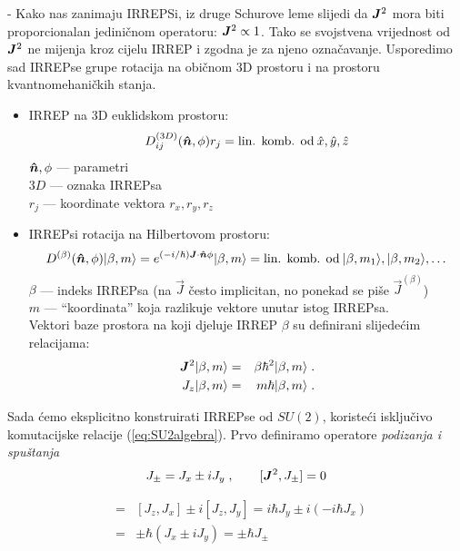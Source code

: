 - Kako nas zanimaju IRREPSi, iz druge Schurove leme slijedi da $\jsq$
mora biti proporcionalan jediničnom operatoru: $\jsq \propto \Eins$.
Tako se svojstvena vrijednost od $\jsq$ ne mijenja kroz cijelu IRREP i
zgodna je za njeno označavanje. Usporedimo sad IRREPse grupe rotacija
na običnom 3D prostoru i na prostoru kvantnomehaničkih stanja.

\begin{itemize}
\item  IRREP na 3D euklidskom prostoru:
\begin{displaymath}
   D^{(3D)}_{ij}(\unitn, \phi) r_j = \text{lin. komb. od}\: \hat{x}, \hat{y}, \hat{z}
\end{displaymath}
   $\unitn, \phi$ --- parametri \\
  $3D$ --- oznaka IRREPsa \\
  $r_j$ --- koordinate vektora $r_x, r_y, r_z$

\item IRREPsi rotacija na Hilbertovom prostoru:
\begin{displaymath}
   D^{(\beta)}(\unitn,\phi) \ket{\beta, m} =
 e^{(-i/\hbar)\vec{J}\cdot\unitn\phi}\ket{\beta, m} =
\text{lin. komb. od}\: \ket{\beta, m_1}, \ket{\beta, m_2}, \dots
\end{displaymath}
$\beta$ --- indeks IRREPsa (na $\vec{J}$ često implicitan, no
 ponekad se piše $\vec{J}^{(\beta)}$) \\
$ m $ --- ``koordinata'' koja razlikuje vektore unutar istog IRREPsa.\\
 Vektori baze prostora na koji djeluje IRREP $\beta$ su definirani slijedećim
relacijama:
\begin{eqnarray}
  \jsq \ket{\beta, m} &=& \beta \hbar^2 \ket{\beta, m} \;.  \\
  J_z \ket{\beta, m} &=& m \hbar \ket{\beta, m} \;.
\end{eqnarray}
\end{itemize}

Sada ćemo eksplicitno konstruirati IRREPse od $SU(2)$, koristeći
isključivo komutacijske relacije (\ref{eq:SU2algebra}).
Prvo definiramo operatore \emph{podizanja i spuštanja}
\begin{displaymath}
    J_{\pm} = J_x \pm i J_y \;, \qquad [\jsq, J_\pm] =0
\end{displaymath}
 
\begin{eqnarray*}
 [J_z, J_\pm]& = & [J_z, J_x] \pm i [J_z, J_y] = i\hbar J_y \pm i (-i\hbar J_x)
 \\ & = & \pm \hbar (J_x \pm i J_y) = \pm \hbar J_\pm
\end{eqnarray*}

